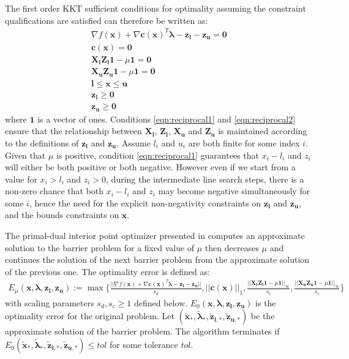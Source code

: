   The first order KKT sufficient conditions for optimality assuming the constraint qualifications are satisfied can therefore be written as:
  \begin{align}
      \nabla f(\bm{x}) + \nabla \bm{c}(\bm{x})^T \bm{\lambda} - \bm{z}_{\bm{l}} - \bm{z}_{\bm{u}} = \bm{0} \\
      \bm{c}(\bm{x}) = \bm{0} \\
      \bm{X}_{\bm{l}} \bm{Z}_{\bm{l}} \bm{1} - \mu \bm{1} = \bm{0} \label{eqn:reciprocal1} \\
      \bm{X}_{\bm{u}} \bm{Z}_{\bm{u}} \bm{1} - \mu \bm{1} = \bm{0} \label{eqn:reciprocal2} \\
      \bm{l} \leq \bm{x} \leq \bm{u} \\
      \bm{z}_{\bm{l}} \geq \bm{0} \\
      \bm{z}_{\bm{u}} \geq \bm{0}
  \end{align}
  where $\bm{1}$ is a vector of ones. Conditions \ref{eqn:reciprocal1} and \ref{eqn:reciprocal2} ensure that the relationship between $\bm{X}_{\bm{l}}$, $\bm{Z}_{\bm{l}}$, $\bm{X}_{\bm{u}}$ and $\bm{Z}_{\bm{u}}$ is maintained according to the definitions of $\bm{z}_{\bm{l}}$ and $\bm{z}_{\bm{u}}$. Assume $l_i$ and $u_i$ are both finite for some index $i$. Given that $\mu$ is positive, condition \ref{eqn:reciprocal1} guarantees that $x_i - l_i$ and $z_i$ will either be both positive or both negative. However even if we start from a value for $x_i > l_i$ and $z_i > 0$, during the intermediate line search steps, there is a non-zero chance that both $x_i - l_i$ and $z_i$ may become negative simultaneously for some $i$, hence the need for the explicit non-negativity constraints on $\bm{z}_{\bm{l}}$ and $\bm{z}_{\bm{u}}$, and the bounds constraints on $\bm{x}$.
  
  The primal-dual interior point optimizer presented in \cite{Wachter2006} computes an approximate solution to the barrier problem for a fixed value of $\mu$ then decreases $\mu$ and continues the solution of the next barrier problem from the approximate solution of the previous one. The optimality error is defined as:
  \begin{align}
      E_{\mu}(\bm{x}, \bm{\lambda}, \bm{z}_{\bm{l}}, \bm{z}_{\bm{u}}) := \max \Bigg\{ \frac{||\nabla f(\bm{x}) + \nabla \bm{c}(\bm{x})^T \bm{\lambda} - \bm{z}_{\bm{l}} - \bm{z}_{\bm{u}}||}{s_d}, ||\bm{c}(\bm{x})||_1, \frac{||\bm{X}_{\bm{l}} \bm{Z}_{\bm{l}} \bm{1} - \mu \bm{1}||_{\infty}}{s_c}, \frac{||\bm{X}_{\bm{u}} \bm{Z}_{\bm{u}} \bm{1} - \mu \bm{1}||_{\infty}}{s_c} \Bigg\}
  \end{align}
  with scaling parameters $s_d, s_c \geq 1$ defined below. $E_0(\bm{x}, \bm{\lambda}, \bm{z}_{\bm{l}}, \bm{z}_{\bm{u}})$ is the optimality error for the original problem. Let $(\tilde{\bm{x}}_*, \tilde{\bm{\lambda}}_*, \tilde{\bm{z}}_{\bm{l}, *}, \tilde{\bm{z}}_{\bm{u}, *})$ be the approximate solution of the barrier problem. The algorithm terminates if $E_0(\tilde{\bm{x}}_*, \tilde{\bm{\lambda}}_*, \tilde{\bm{z}}_{\bm{l}, *}, \tilde{\bm{z}}_{\bm{u}, *}) \leq tol$ for some tolerance $tol$.
  
